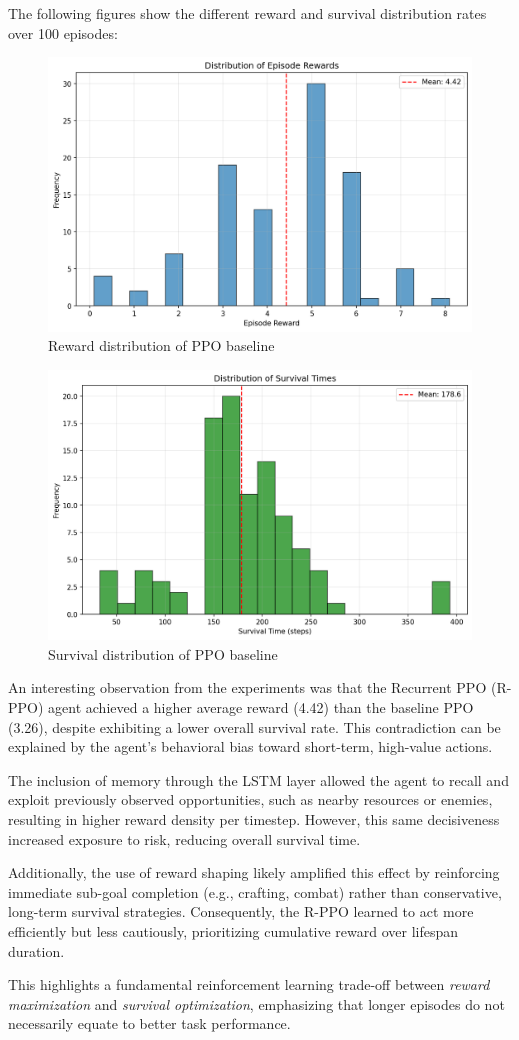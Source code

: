 \documentclass[twocolumn]{article}
\begin{document}
The following figures show the different reward and survival distribution rates over 100 episodes:

\begin{figure}[H]
    \centering
    \includegraphics[width=0.75\linewidth]{images/reward_distribution_ppo_improv2.png}
    \caption{Reward distribution of PPO baseline}
    \label{fig:placeholder}
\end{figure}
\begin{figure}[H]
    \centering
    \includegraphics[width=0.75\linewidth]{images/survival_distribution_ppo_improv2.png}
    \caption{Survival distribution of PPO baseline}
    \label{fig:placeholder}
\end{figure}

An interesting observation from the experiments was that the Recurrent PPO (R-PPO) agent achieved a higher average reward (4.42) than the baseline PPO (3.26), despite exhibiting a lower overall survival rate. This contradiction can be explained by the agent's behavioral bias toward short-term, high-value actions.

The inclusion of memory through the LSTM layer allowed the agent to recall and exploit previously observed opportunities, such as nearby resources or enemies, resulting in higher reward density per timestep. However, this same decisiveness increased exposure to risk, reducing overall survival time.

Additionally, the use of reward shaping likely amplified this effect by reinforcing immediate sub-goal completion (e.g., crafting, combat) rather than conservative, long-term survival strategies. Consequently, the R-PPO learned to act more efficiently but less cautiously, prioritizing cumulative reward over lifespan duration.

This highlights a fundamental reinforcement learning trade-off between \textit{reward maximization} and \textit{survival optimization}, emphasizing that longer episodes do not necessarily equate to better task performance.
\end{document}
